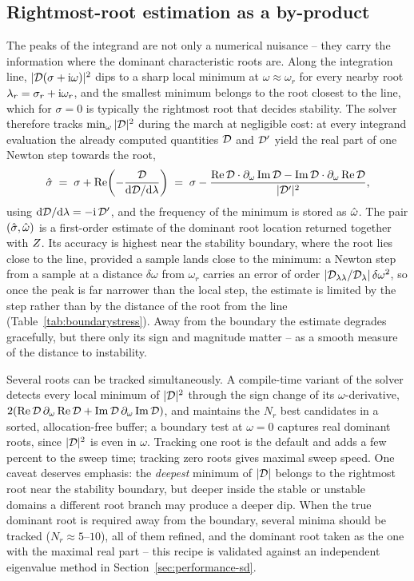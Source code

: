 \subsection{Rightmost-root estimation as a by-product}\label{sec:tracking}

The peaks of the integrand are not only a numerical nuisance -- they carry
the information where the dominant characteristic roots are. Along the
integration line, $|\mathcal{D}(\sigma+\mathrm{i}\omega)|^{2}$ dips to a sharp local
minimum at $\omega\approx\omega_r$ for every nearby root
$\lambda_r=\sigma_r+\mathrm{i}\omega_r$, and the smallest minimum belongs to the root
closest to the line, which for $\sigma=0$ is typically the rightmost root
that decides stability. The solver therefore tracks
$\min_\omega|\mathcal{D}|^{2}$ during the march at negligible cost: at every
integrand evaluation the already computed quantities $\mathcal{D}$ and $\mathcal{D}'$
yield the real part of one Newton step towards the root,
\begin{equation}\label{eq:sigmaest}
  \hat{\sigma} \;=\; \sigma + \operatorname{Re}\!\left(-\frac{\mathcal{D}}{\mathrm{d}\mathcal{D}/\mathrm{d}\lambda}\right)
        \;=\; \sigma - \frac{\operatorname{Re}\mathcal{D}\cdot\partial_\omega\operatorname{Im}\mathcal{D}
              - \operatorname{Im}\mathcal{D}\cdot\partial_\omega\operatorname{Re}\mathcal{D}}{|\mathcal{D}'|^{2}},
\end{equation}
using $\mathrm{d}\mathcal{D}/\mathrm{d}\lambda=-\mathrm{i}\,\mathcal{D}'$, and the frequency of the minimum is
stored as $\hat{\omega}$. The pair $(\hat{\sigma},\hat{\omega})$ is a first-order estimate of the
dominant root location returned together with $Z$. Its accuracy is
highest near the stability boundary, where the root lies close to the line,
provided a sample lands close to the minimum: a Newton step from a sample at a
distance $\delta\omega$ from $\omega_r$ carries an error of order
$|\mathcal{D}_{\lambda\lambda}/\mathcal{D}_\lambda|\,\delta\omega^{2}$, so once the peak is far
narrower than the local step, the estimate is limited by the step rather than
by the distance of the root from the line (Table~\ref{tab:boundarystress}).
Away from the boundary the estimate degrades gracefully, but there only its
sign and magnitude matter -- as a smooth measure of the distance to
instability.

Several roots can be tracked simultaneously. A compile-time variant of the
solver detects every local minimum of $|\mathcal{D}|^{2}$ through the sign change
of its $\omega$-derivative, $2(\operatorname{Re}\mathcal{D}\,\partial_\omega\operatorname{Re}\mathcal{D} +
\operatorname{Im}\mathcal{D}\,\partial_\omega\operatorname{Im}\mathcal{D})$, and maintains the $N_r$ best
candidates in a sorted, allocation-free buffer; a boundary test at
$\omega=0$ captures real dominant roots, since $|\mathcal{D}|^{2}$ is even in
$\omega$. Tracking one root is the default and adds a few percent to the sweep
time; tracking zero roots gives maximal sweep speed. One caveat deserves emphasis: the
\emph{deepest} minimum of $|\mathcal{D}|$ belongs to the rightmost root near the
stability boundary, but deeper inside the stable or unstable domains a
different root branch may produce a deeper dip. When the true dominant root
is required away from the boundary, several minima should be tracked
($N_r\approx5$--$10$), all of them refined, and the dominant root taken as
the one with the maximal real part -- this recipe is validated against an
independent eigenvalue method in Section~\ref{sec:performance-sd}.

